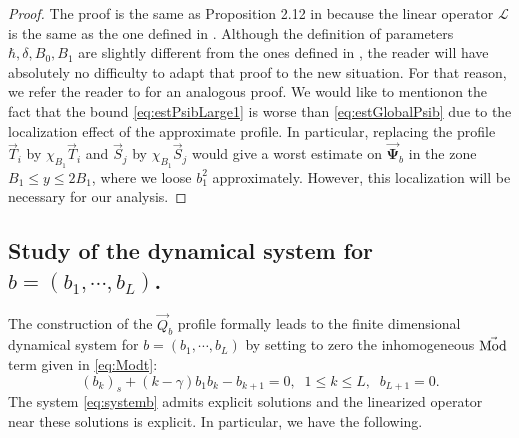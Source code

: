 \documentclass[11pt]{aims}
\theoremstyle{definition}
\numberwithin{equation}{section}
\begin{document}
\begin{proof} 
The proof is the same as  Proposition 2.12 in \cite{IGN16} because the linear operator ${\mathscr{L}}$ is the same as the one defined in \cite{IGN16}. Although the definition of parameters $\hbar, \delta, B_0, B_1$ are slightly different from the ones defined in \cite{IGN16}, the reader will have absolutely no difficulty to adapt that proof to the new situation. For that reason, we refer the reader to \cite{IGN16} for an analogous proof. We would like to mentionon the fact that the bound \eqref{eq:estPsibLarge1} is worse than \eqref{eq:estGlobalPsib} due to the localization effect of the approximate profile. In particular, replacing the profile $\vec{T}_i$ by $\chi_{B_1}\vec{T}_i$ and $\vec{S}_j$ by $\chi_{B_1}\vec S_j$ would give a worst estimate on $\vec {\mathbf{\Psi}}_b$ in the zone $B_1 \leq y \leq 2B_1$, where we loose $b_1^2$ approximately.  However, this localization will be necessary for our analysis. 
\end{proof}
\subsection{Study of the dynamical system for $b = (b_1, \cdots, b_L)$.}
The construction of the $\vec Q_b$ profile formally leads to the finite dimensional dynamical system for $b = (b_1, \cdots, b_L)$ by setting to zero the inhomogeneous $\vec{\textup{Mod}}$ term given in \eqref{eq:Modt}:
\begin{equation}\label{eq:systemb}
(b_k)_s + (k - \gamma)b_1b_k - b_{k+1} = 0, \;\; 1 \leq k \leq L, \;\; b_{L+1} = 0.
\end{equation}
The system \eqref{eq:systemb} admits explicit solutions and the linearized operator near these solutions is explicit. In particular, we have the following.
\end{document}
